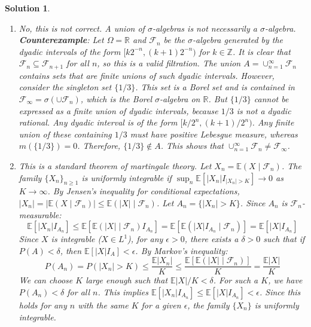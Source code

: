 \documentclass[12pt]{amsart}
\newtheorem*{solution}{Solution}
\begin{document}
\begin{solution}
\begin{enumerate}[label=(\alph*)]
\item No, this is not correct. A union of $\sigma$-algebras is not necessarily a $\sigma$-algebra.
\textbf{Counterexample}: Let $\Omega = \mathbb{R}$ and $\mathcal{F}_n$ be the $\sigma$-algebra generated by the dyadic intervals of the form $[k2^{-n}, (k+1)2^{-n})$ for $k \in \mathbb{Z}$.
It is clear that $\mathcal{F}_n \subseteq \mathcal{F}_{n+1}$ for all $n$, so this is a valid filtration.
The union $A = \cup_{n=1}^\infty \mathcal{F}_n$ contains sets that are finite unions of such dyadic intervals.
However, consider the singleton set $\{1/3\}$. This set is a Borel set and is contained in $\mathcal{F}_\infty = \sigma(\cup \mathcal{F}_n)$, which is the Borel $\sigma$-algebra on $\mathbb{R}$.
But $\{1/3\}$ cannot be expressed as a finite union of dyadic intervals, because $1/3$ is not a dyadic rational. Any dyadic interval is of the form $[k/2^n, (k+1)/2^n)$. Any finite union of these containing $1/3$ must have positive Lebesgue measure, whereas $m(\{1/3\})=0$. Therefore, $\{1/3\} \notin A$.
This shows that $\cup_{n=1}^{\infty} \mathcal{F}_n \neq \mathcal{F}_{\infty}$.

\item This is a standard theorem of martingale theory. Let $X_n = \mathbb{E}(X \mid \mathcal{F}_n)$. The family $\{X_n\}_{n \ge 1}$ is uniformly integrable if $\sup_n \mathbb{E}[|X_n| I_{|X_n|>K}] \to 0$ as $K \to \infty$.
By Jensen's inequality for conditional expectations, $|X_n| = |\mathbb{E}(X \mid \mathcal{F}_n)| \le \mathbb{E}(|X| \mid \mathcal{F}_n)$.
Let $A_n = \{|X_n| > K\}$. Since $A_n$ is $\mathcal{F}_n$-measurable:
$$ \mathbb{E}[|X_n| I_{A_n}] \le \mathbb{E}[\mathbb{E}(|X| \mid \mathcal{F}_n) I_{A_n}] = \mathbb{E}[\mathbb{E}(|X|I_{A_n} \mid \mathcal{F}_n)] = \mathbb{E}[|X|I_{A_n}] $$
Since $X$ is integrable ($X \in L^1$), for any $\epsilon > 0$, there exists a $\delta > 0$ such that if $P(A) < \delta$, then $\mathbb{E}[|X|I_A] < \epsilon$.
By Markov's inequality:
$$ P(A_n) = P(|X_n| > K) \le \frac{\mathbb{E}|X_n|}{K} \le \frac{\mathbb{E}[\mathbb{E}(|X| \mid \mathcal{F}_n)]}{K} = \frac{\mathbb{E}|X|}{K} $$
We can choose $K$ large enough such that $\mathbb{E}|X|/K < \delta$. For such a $K$, we have $P(A_n) < \delta$ for all $n$.
This implies $\mathbb{E}[|X_n| I_{A_n}] \le \mathbb{E}[|X|I_{A_n}] < \epsilon$.
Since this holds for any $n$ with the same $K$ for a given $\epsilon$, the family $\{X_n\}$ is uniformly integrable.


\end{enumerate}
\end{solution}
\end{document}
